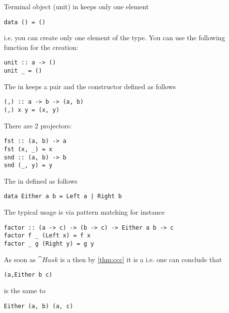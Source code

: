\begin{example}
\label{ex:hask_terminal_object}
Terminal object (unit) in  keeps only one element
\begin{verbatim}
data () = ()
\end{verbatim}
i.e. you can create only one element of the type. You can use the
following function for the creation:
\begin{verbatim}
unit :: a -> ()
unit _ = ()
\end{verbatim}
\end{example}

\begin{example}
\label{ex:hask_product}
The  in  keeps a
pair and the constructor defined as follows
\begin{verbatim}
(,) :: a -> b -> (a, b)
(,) x y = (x, y)
\end{verbatim}
There are 2 projectors: 
\begin{verbatim}
fst :: (a, b) -> a
fst (x, _) = x
snd :: (a, b) -> b
snd (_, y) = y
\end{verbatim}
\end{example}

\begin{example}
\label{ex:hask_sum}
The  in  defined as
follows 
\begin{verbatim}
data Either a b = Left a | Right b
\end{verbatim}

The typical usage is via pattern matching for instance 
\begin{verbatim}
factor :: (a -> c) -> (b -> c) -> Either a b -> c
factor f _ (Left x) = f x
factor _ g (Right y) = g y
\end{verbatim}
\end{example}

\begin{example}
As soon as $\cat{Hask}$ is a 
then by \cref{thm:ccc} it is a 
i.e. one can conclude that
\begin{verbatim}
(a,Either b c)
\end{verbatim}
is the same to
\begin{verbatim}
Either (a, b) (a, c)
\end{verbatim}
\end{example}

